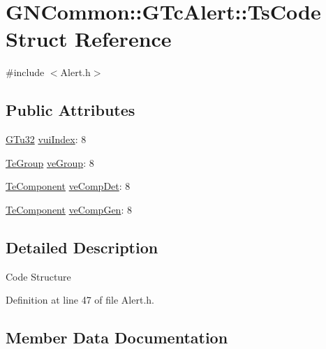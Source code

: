\hypertarget{struct_g_n_common_1_1_g_tc_alert_1_1_ts_code}{}\section{G\+N\+Common\+:\+:G\+Tc\+Alert\+:\+:Ts\+Code Struct Reference}
\label{struct_g_n_common_1_1_g_tc_alert_1_1_ts_code}


{\ttfamily \#include $<$Alert.\+h$>$}

\subsection*{Public Attributes}
\begin{DoxyCompactItemize}
\item 
\mbox{\hyperlink{namespace_g_n_common_ae5485474bc8f23e462e920a17b377b53}{G\+Tu32}} \mbox{\hyperlink{struct_g_n_common_1_1_g_tc_alert_1_1_ts_code_a26e48af7d046561144f85fe111cbc8b3}{vui\+Index}}\+: 8
\item 
\mbox{\hyperlink{class_g_n_common_1_1_g_tc_alert_a2deb7f82fcf5d88b4e10d74fa6c28cb7}{Te\+Group}} \mbox{\hyperlink{struct_g_n_common_1_1_g_tc_alert_1_1_ts_code_a5d0eff781b125af6518d4d11304bf1a5}{ve\+Group}}\+: 8
\item 
\mbox{\hyperlink{class_g_n_common_1_1_g_tc_alert_aec0a7908321c01ae225df4908d7f3fa0}{Te\+Component}} \mbox{\hyperlink{struct_g_n_common_1_1_g_tc_alert_1_1_ts_code_a0ebb96c706c4df9641d0c9a55bf00f4b}{ve\+Comp\+Det}}\+: 8
\item 
\mbox{\hyperlink{class_g_n_common_1_1_g_tc_alert_aec0a7908321c01ae225df4908d7f3fa0}{Te\+Component}} \mbox{\hyperlink{struct_g_n_common_1_1_g_tc_alert_1_1_ts_code_aab8ef411910f365c4149b13da11228cb}{ve\+Comp\+Gen}}\+: 8
\end{DoxyCompactItemize}


\subsection{Detailed Description}
Code Structure 

Definition at line 47 of file Alert.\+h.



\subsection{Member Data Documentation}
\mbox{\label{struct_g_n_common_1_1_g_tc_alert_1_1_ts_code_a0ebb96c706c4df9641d0c9a55bf00f4b}} 
